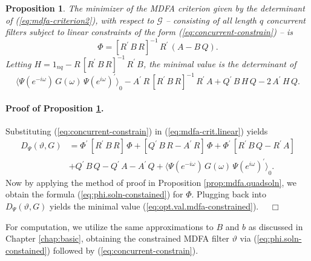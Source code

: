 \documentclass[a4paper]{book}
\newtheorem{Proposition}{Proposition}
\begin{document}
\begin{Proposition}
\label{prop:mdfa.quadsoln-constrain}
 The minimizer of the  MDFA criterion given by the determinant of
 (\ref{eq:mdfa-criterion2}),  with respect to  $\mathcal{G}$  -- consisting 
 of all length $q$ concurrent filters 
 subject to  linear constraints of the form (\ref{eq:concurrent-constrain}) -- is
\begin{equation}
\label{eq:phi.soln-constained}
 \Phi =  { \left[ R^{\prime} \, B \, R \right] }^{-1} \, R^{\prime} \, 
 \left( A - B \, Q \right).
\end{equation}
  Letting $H = 1_{nq} - R \,   { \left[ R^{\prime} \, B \, R \right] }^{-1} \,
  R^{\prime} \, B$, the minimal value is the determinant of
\begin{equation}
\label{eq:opt.val.mdfa-constrained}
{ \langle \Psi (e^{-i \omega}) \, G (\omega) \, { \Psi (e^{i \omega}) }^{\prime} \rangle }_0 -
 A^{\prime} \, R \, { \left[ R^{\prime} \, B \, R \right] }^{-1} \, R^{\prime} \,  A
	+ Q^{\prime} \, B \, H \, Q - 2 \, A^{\prime} \, H \, Q.
\end{equation}
\end{Proposition}

 
  
\paragraph{Proof of Proposition \ref{prop:mdfa.quadsoln-constrain}.}
 Substituting (\ref{eq:concurrent-constrain}) in (\ref{eq:mdfa-crit.linear}) yields
\begin{align*}
  D_{\Psi} (\vartheta, G) &  = \Phi^{\prime} \,  \left[ R^{\prime} \, B \, R \right] \,  \Phi 
  + \left[ Q^{\prime} \, B \, R - A^{\prime} \, R \right] \, \Phi + \Phi^{\prime} \,
   \left[ R^{\prime} \, B \, Q - R^{\prime} \, A \right]  \\
 & + Q^{\prime} \, B \, Q  - Q^{\prime} \, A - A^{\prime} \, Q  + 
{ \langle \Psi (e^{-i \omega}) \, G (\omega) \, { \Psi (e^{i \omega}) }^{\prime} \rangle }_0.
\end{align*}
  Now by applying the method of proof in Proposition \ref{prop:mdfa.quadsoln}, we obtain 
  the formula (\ref{eq:phi.soln-constained}) for $\Phi$.  Plugging back into
  $D_{\Psi} (\vartheta, G)$ yields the minimal value 
  (\ref{eq:opt.val.mdfa-constrained}).  $\quad \Box$

\vspace{.5cm}

For computation, we utilize the same approximations to $B$ and $b$ as discussed 
in  Chapter \ref{chap:basic},
 obtaining the constrained MDFA filter $\vartheta$ via (\ref{eq:phi.soln-constained})
 followed by (\ref{eq:concurrent-constrain}).
\end{document}
